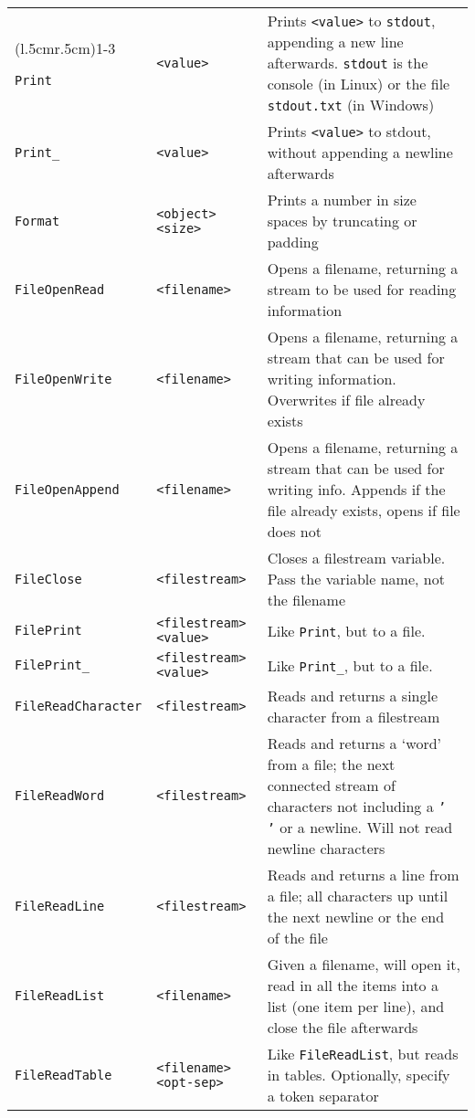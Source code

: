 \begin{longtable}{p{3cm}p{3cm}p{6cm}}
\addlinespace[0.2cm] 
\midrule 
\multicolumn{3}{c}{\textbf{File/NetworkStream Functions}}\\ 
\cmidrule(l{.5cm}r{.5cm}){1-3} 

\verb+Print+ &\verb+<value>+ &Prints \verb+<value>+ to \texttt{stdout}, appending a new line afterwards. \texttt{stdout} is the console (in Linux) or the file \texttt{stdout.txt} (in Windows)\\ 
\verb+Print_+ &\verb+<value>+ &Prints \verb+<value>+ to stdout, without appending a newline afterwards\\ 
\verb+Format+ &\verb+<object>+ \verb+<size>+ &Prints a number in size spaces by truncating or padding \\ 
\verb+FileOpenRead+ &\verb+<filename>+ &Opens a filename, returning a stream to be used for reading information\\ 
\verb+FileOpenWrite+ &\verb+<filename>+ &Opens a filename, returning a stream that can be used for writing information. Overwrites if file already exists\\ 
\verb+FileOpenAppend+ &\verb+<filename>+ &Opens a filename, returning a stream that can be used for writing info. Appends if the file already exists, opens if file does not\\ 
\verb+FileClose+ &\verb+<filestream>+&Closes a filestream variable. Pass the variable name, not the filename\\ 
\verb+FilePrint+ &\verb+<filestream>+ \verb+<value>+ &Like \verb+Print+, but to a file.\\ 
\verb+FilePrint_+ &\verb+<filestream>+ \verb+<value>+ &Like \verb+Print_+, but to a file.\\ 
\verb+FileReadCharacter+ &\verb+<filestream>+ &Reads and returns a single character from a filestream\\ 
\verb+FileReadWord+ &\verb+<filestream>+&Reads and returns a `word' from a file; the next connected stream of characters not including a \texttt{' '} or a newline. Will not read newline characters\\ 
\verb+FileReadLine+ &\verb+<filestream>+&Reads and returns a line from a file; all characters up until the next newline or the end of the file\\ 
\verb+FileReadList+ &\verb+<filename>+ &Given a filename, will open it, read in all the items into a list (one item per line), and close the file afterwards\\ 
\verb+FileReadTable+ &\verb+<filename>+ \verb+<opt-sep>+ &Like \verb+FileReadList+, but reads in tables. Optionally, specify a token separator\\ 

\end{longtable}
